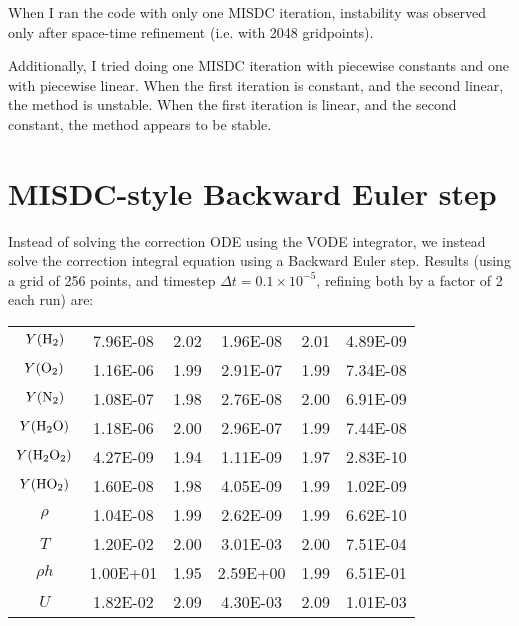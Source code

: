 \documentclass[12pt]{article}
\begin{document}
When I ran the code with only one MISDC iteration, instability was observed 
only after space-time refinement (i.e. with 2048 gridpoints).

Additionally, I tried doing one MISDC iteration with piecewise constants and 
one with piecewise linear. When the first iteration is constant, and the 
second linear, the method is unstable. When the first iteration is linear, and 
the second constant, the method appears to be stable.

\section{MISDC-style Backward Euler step}
Instead of solving the correction ODE using the VODE integrator, we instead 
solve the correction integral equation using a Backward Euler step. Results 
(using a grid of 256 points, and timestep $\Delta t = 0.1\times10^{-5}$, 
refining both by a factor of 2 each run) are:
\begin{center}
\begin{tabular}{ c c c c c c }
$Y({\rm H}_2)$          & 7.96E-08 & 2.02 & 1.96E-08 & 2.01 & 4.89E-09 \\
$Y({\rm O}_2)$          & 1.16E-06 & 1.99 & 2.91E-07 & 1.99 & 7.34E-08 \\
$Y({\rm N}_2)$          & 1.08E-07 & 1.98 & 2.76E-08 & 2.00 & 6.91E-09 \\
$Y({\rm H}_2{\rm O})$   & 1.18E-06 & 2.00 & 2.96E-07 & 1.99 & 7.44E-08 \\
$Y({\rm H}_2{\rm O}_2)$ & 4.27E-09 & 1.94 & 1.11E-09 & 1.97 & 2.83E-10 \\
$Y({\rm HO}_2)$         & 1.60E-08 & 1.98 & 4.05E-09 & 1.99 & 1.02E-09 \\
$\rho$                  & 1.04E-08 & 1.99 & 2.62E-09 & 1.99 & 6.62E-10 \\
$T$                     & 1.20E-02 & 2.00 & 3.01E-03 & 2.00 & 7.51E-04 \\
$\rho h$                & 1.00E+01 & 1.95 & 2.59E+00 & 1.99 & 6.51E-01 \\
$U$                     & 1.82E-02 & 2.09 & 4.30E-03 & 2.09 & 1.01E-03 \\
\end{tabular}
\end{center}

\end{document}
